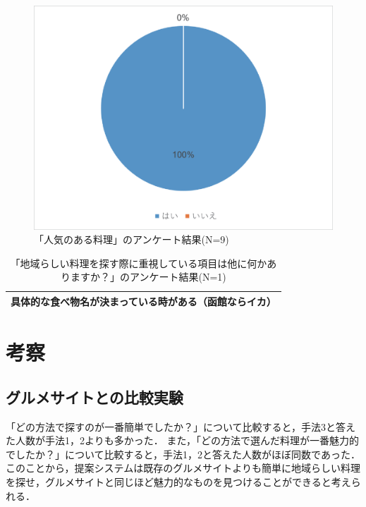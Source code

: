 \documentclass{funthesis}
\begin{document}
\begin{figure}[tbp]
  \begin{center}
    \includegraphics[clip,width=12cm]{5.7.eps}
    \caption[「人気のある料理」のアンケート結果]{「人気のある料理」のアンケート結果(N=9)}
  \end{center}
\end{figure}

\begin{table}[htb]
  \begin{center}
  \scriptsize
    \caption[「地域らしい料理を探す際に重視している項目は他に何かありますか？」のアンケート結果]{「地域らしい料理を探す際に重視している項目は他に何かありますか？」のアンケート結果(N=1)}
    \normalsize
   \begin{tabular}{p{13cm}}
    \hline
 具体的な食べ物名が決まっている時がある（函館ならイカ）\\ \hline
  \end{tabular}
  \end{center}
\end{table}

\section{考察}
\subsection{グルメサイトとの比較実験}
「どの方法で探すのが一番簡単でしたか？」について比較すると，手法3と答えた人数が手法1，2よりも多かった．
また，「どの方法で選んだ料理が一番魅力的でしたか？」について比較すると，手法1，2と答えた人数がほぼ同数であった．
このことから，提案システムは既存のグルメサイトよりも簡単に地域らしい料理を探せ，グルメサイトと同じほど魅力的なものを見つけることができると考えられる．
\end{document}
